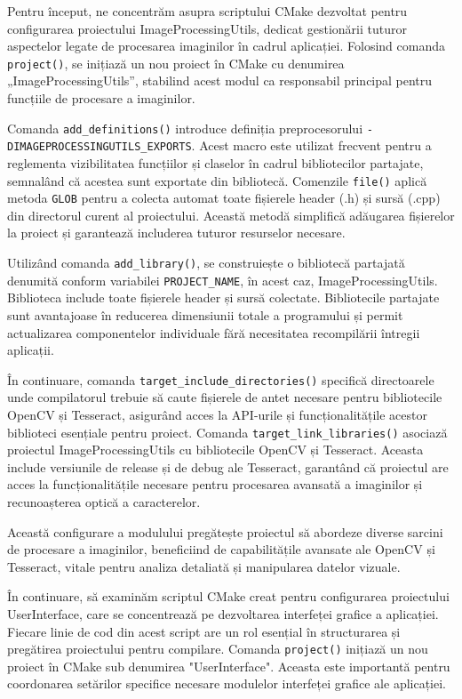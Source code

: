 \documentclass[a4paper,12pt]{report}
\begin{document}
Pentru început, ne concentrăm asupra scriptului CMake dezvoltat pentru configurarea proiectului ImageProcessingUtils, dedicat gestionării tuturor aspectelor legate de procesarea imaginilor în cadrul aplicației. Folosind comanda \texttt{project()}, se inițiază un nou proiect în CMake cu denumirea „ImageProcessingUtils”, stabilind acest modul ca responsabil principal pentru funcțiile de procesare a imaginilor.

Comanda \texttt{add\_definitions()} introduce definiția preprocesorului \newline \texttt{-DIMAGEPROCESSINGUTILS\_EXPORTS}. Acest macro este utilizat frecvent pentru a reglementa vizibilitatea funcțiilor și claselor în cadrul bibliotecilor partajate, semnalând că acestea sunt exportate din bibliotecă. Comenzile \texttt{file()} aplică metoda \texttt{GLOB} pentru a colecta automat toate fișierele header (.h) și sursă (.cpp) din directorul curent al proiectului. Această metodă simplifică adăugarea fișierelor la proiect și garantează includerea tuturor resurselor necesare.

Utilizând comanda \texttt{add\_library()}, se construiește o bibliotecă partajată denumită conform variabilei \texttt{PROJECT\_NAME}, în acest caz, ImageProcessingUtils. Biblioteca include toate fișierele header și sursă colectate. Bibliotecile partajate sunt avantajoase în reducerea dimensiunii totale a programului și permit actualizarea componentelor individuale fără necesitatea recompilării întregii aplicații.

În continuare, comanda \texttt{target\_include\_directories()} specifică directoarele unde compilatorul trebuie să caute fișierele de antet necesare pentru bibliotecile OpenCV și Tesseract, asigurând acces la API-urile și funcționalitățile acestor biblioteci esențiale pentru proiect. Comanda \texttt{target\_link\_libraries()} asociază proiectul ImageProcessingUtils cu bibliotecile OpenCV și Tesseract. Aceasta include versiunile de release și de debug ale Tesseract, garantând că proiectul are acces la funcționalitățile necesare pentru procesarea avansată a imaginilor și recunoașterea optică a caracterelor.

Această configurare a modulului pregătește proiectul să abordeze diverse sarcini de procesare a imaginilor, beneficiind de capabilitățile avansate ale OpenCV și Tesseract, vitale pentru analiza detaliată și manipularea datelor vizuale.

În continuare, să examinăm scriptul CMake creat pentru configurarea proiectului UserInterface, care se concentrează pe dezvoltarea interfeței grafice a aplicației. Fiecare linie de cod din acest script are un rol esențial în structurarea și pregătirea proiectului pentru compilare. Comanda \texttt{project()} inițiază un nou proiect în CMake sub denumirea "UserInterface". Aceasta este importantă pentru coordonarea setărilor specifice necesare modulelor interfeței grafice ale aplicației.
\end{document}
